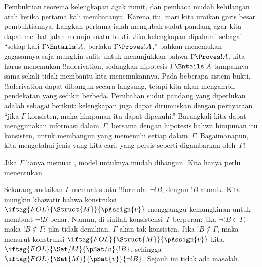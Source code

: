 \documentclass[../../../include/open-logic-section]{subfiles}
\begin{document}
      {}
      {}


Pembuktian teorema kelengkapan agak rumit, dan pembaca mudah kehilangan
arah ketika pertama kali membacanya. Karena itu, mari kita uraikan garis
besar pembuktiannya. Langkah pertama ialah mengubah sudut pandang agar
kita dapat melihat jalan menuju suatu bukti. Jika kelengkapan dipahami
sebagai ``setiap kali $\Gamma \Entails !A$, berlaku $\Gamma \Proves
!A$,'' bahkan menemukan gagasannya saja mungkin sulit: untuk menunjukkan
bahwa $\Gamma \Proves !A$, kita harus menemukan !!a{derivation}, sedangkan
hipotesis $\Gamma \Entails !A$ tampaknya sama sekali tidak membantu kita
menemukannya. Pada beberapa sistem bukti, !!a{derivation} dapat dibangun
secara langsung, tetapi kita akan mengambil pendekatan yang sedikit
berbeda. Perubahan sudut pandang yang diperlukan adalah sebagai berikut:
kelengkapan juga dapat dirumuskan dengan pernyataan ``jika $\Gamma$
konsisten, maka himpunan itu dapat dipenuhi.'' Barangkali kita dapat
menggunakan informasi dalam~$\Gamma$, bersama dengan hipotesis bahwa
himpunan itu konsisten, untuk membangun
 yang memenuhi setiap
 dalam~$\Gamma$. Bagaimanapun, kita
mengetahui jenis  yang kita
cari: yang persis seperti digambarkan oleh~$\Gamma$!{}

Jika $\Gamma$ hanya memuat , model untuknya mudah dibangun.
Kita hanya perlu menentukan

Sekarang andaikan $\Gamma$ memuat suatu !!{formula}~$\lnot !B$, dengan
$!B$ atomik. Kita mungkin khawatir bahwa konstruksi
$\iftag{FOL}{\Struct{M}}{\pAssign{v}}$ mengganggu kemungkinan untuk
membuat $\lnot !B$ benar. Namun, di sinilah konsistensi~$\Gamma$
berperan: jika $\lnot !B \in \Gamma$, maka $!B \notin \Gamma$; jika
tidak demikian, $\Gamma$ akan tak konsisten. Jika $!B \notin \Gamma$,
maka menurut konstruksi $\iftag{FOL}{\Struct{M}}{\pAssign{v}}$ kita,
$\iftag{FOL}{\Sat/{M}}{\pSat/{v}}{!B}$, sehingga
$\iftag{FOL}{\Sat{M}}{\pSat{v}}{\lnot !B}$. Sejauh ini tidak ada
masalah.
\end{document}

